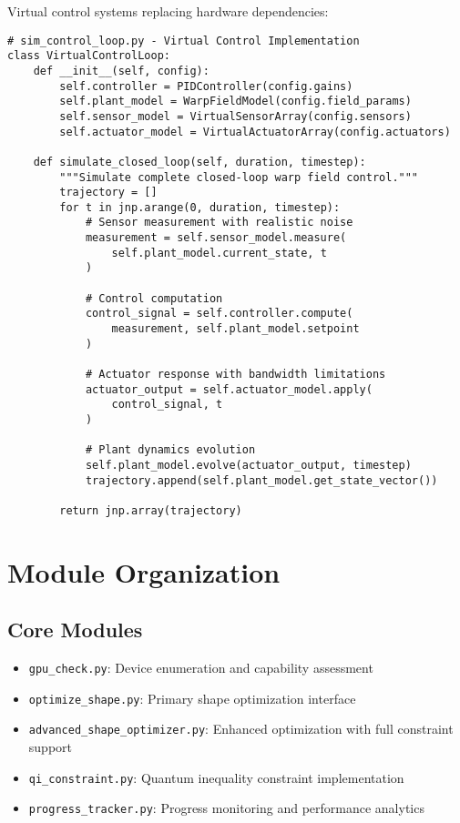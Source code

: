 \documentclass{article}
\begin{document}
Virtual control systems replacing hardware dependencies:

\begin{lstlisting}
# sim_control_loop.py - Virtual Control Implementation
class VirtualControlLoop:
    def __init__(self, config):
        self.controller = PIDController(config.gains)
        self.plant_model = WarpFieldModel(config.field_params)
        self.sensor_model = VirtualSensorArray(config.sensors)
        self.actuator_model = VirtualActuatorArray(config.actuators)
    
    def simulate_closed_loop(self, duration, timestep):
        """Simulate complete closed-loop warp field control."""
        trajectory = []
        for t in jnp.arange(0, duration, timestep):
            # Sensor measurement with realistic noise
            measurement = self.sensor_model.measure(
                self.plant_model.current_state, t
            )
            
            # Control computation
            control_signal = self.controller.compute(
                measurement, self.plant_model.setpoint
            )
            
            # Actuator response with bandwidth limitations
            actuator_output = self.actuator_model.apply(
                control_signal, t
            )
            
            # Plant dynamics evolution
            self.plant_model.evolve(actuator_output, timestep)
            trajectory.append(self.plant_model.get_state_vector())
        
        return jnp.array(trajectory)
\end{lstlisting}

\section{Module Organization}

\subsection{Core Modules}

\begin{itemize}
\item \texttt{gpu\_check.py}: Device enumeration and capability assessment
\item \texttt{optimize\_shape.py}: Primary shape optimization interface
\item \texttt{advanced\_shape\_optimizer.py}: Enhanced optimization with full constraint support
\item \texttt{qi\_constraint.py}: Quantum inequality constraint implementation
\item \texttt{progress\_tracker.py}: Progress monitoring and performance analytics
\end{itemize}
\end{document}
